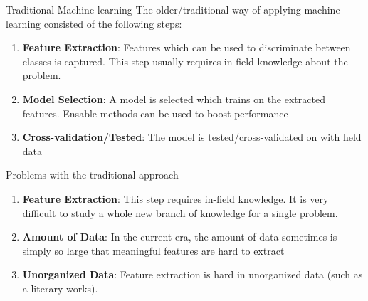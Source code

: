 


\begin{frame}
\end{frame}

\usebackgroundtemplate{ }



\begin{frame}{Traditional Machine learning}
The older/traditional way of applying machine learning consisted of the following steps:
    \begin{enumerate}[$\bullet$]
        \item \textbf{Feature Extraction}: Features which can be used to discriminate between classes is captured. This step usually requires in-field knowledge about the problem.\pause
        \item \textbf{Model Selection}: A model is selected which trains on the extracted features. Ensable methods can be used to boost performance\pause
        \item \textbf{Cross-validation/Tested}: The model is tested/cross-validated on with held data
    \end{enumerate}
\end{frame}

\begin{frame}{Problems with the traditional approach}
      \begin{enumerate}[$\bullet$]
          \item \textbf{Feature Extraction}: This step requires in-field knowledge. It is very difficult to study  a whole new branch of knowledge for a single problem.\pause
          \item \textbf{Amount of Data}: In the current era, the amount of data sometimes is simply so large that meaningful features are hard to extract \pause
          \item \textbf{Unorganized Data}: Feature extraction is hard in unorganized data (such as a literary works). 
      \end{enumerate}
  \end{frame}

